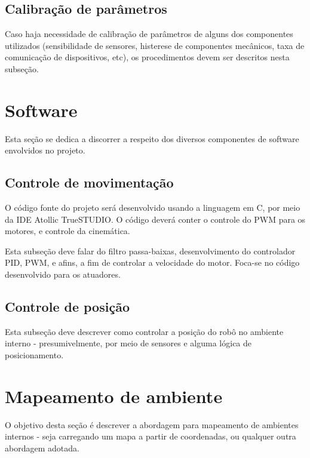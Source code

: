 \subsection{Calibração de parâmetros}
{\color{red} Caso haja necessidade de calibração de parâmetros de alguns dos componentes utilizados (sensibilidade de
sensores, histerese de componentes mecânicos, taxa de comunicação de dispositivos, etc), os procedimentos devem ser
descritos nesta subseção.}

\section{Software}
{\color{red} Esta seção se dedica a discorrer a respeito dos diversos componentes de software envolvidos no projeto.}

\subsection{Controle de movimentação}
O código fonte do projeto será desenvolvido usando a linguagem em C, por meio da IDE Atollic TrueSTUDIO.
O código deverá conter o controle do PWM para os motores, e controle da cinemática.

{\color{red} Esta subseção deve falar do filtro passa-baixas, desenvolvimento do controlador PID, PWM, e afins, a fim de
controlar a velocidade do motor. Foca-se no código desenvolvido para os atuadores.}

\subsection{Controle de posição}
{\color{red} Esta subseção deve descrever como controlar a posição do robô no ambiente interno - presumivelmente, por
meio de sensores e alguma lógica de posicionamento.}

\section{Mapeamento de ambiente}
{\color{red} O objetivo desta seção é descrever a abordagem para mapeamento de ambientes internos - seja carregando um
mapa a partir de coordenadas, ou qualquer outra abordagem adotada.}